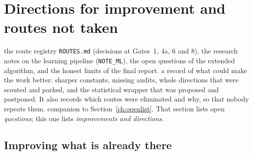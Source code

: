 \section{Directions for improvement and routes not taken}\label{ch:improve}
\sectionbrief
{the route registry \texttt{ROUTES.md} (decisions at Gates~1, 4a, 6 and 8), the research notes on the learning pipeline (\texttt{NOTE\_ML}), the open questions of the extended algorithm, and the honest limits of the final report.}
{a record of what could make the work better: sharper constants, missing audits, whole directions that were scouted and parked, and the statistical wrapper that was proposed and postponed. It also records which routes were eliminated and why, so that nobody repeats them.}
{companion to Section~\ref{ch:openlist}. That section lists open \emph{questions}; this one lists \emph{improvements and directions}.}

\subsection{Improving what is already there}

